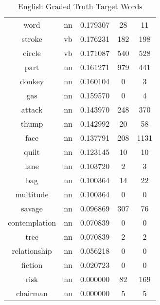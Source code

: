 \begin{table}
\begin{tabular}{ccccc}
word             & nn            & 0.179307           & 28                 & 11                  \\
stroke           & vb            & 0.176231           & 182                & 198                 \\
circle           & vb            & 0.171087           & 540                & 528                 \\
part             & nn            & 0.161271           & 979                & 441                 \\
donkey           & nn            & 0.160104           & 0                  & 3                   \\
gas              & nn            & 0.159570           & 0                  & 4                   \\
attack           & nn            & 0.143970           & 248                & 370                 \\
thump            & nn            & 0.142992           & 20                 & 58                  \\
face             & nn            & 0.137791           & 208                & 1131                \\
quilt            & nn            & 0.123145           & 10                 & 10                  \\
lane             & nn            & 0.103720           & 2                  & 3                   \\
bag              & nn            & 0.100364           & 14                 & 22                  \\
multitude        & nn            & 0.100364           & 0                  & 0                   \\
savage           & nn            & 0.096869           & 307                & 76                  \\
contemplation    & nn            & 0.070839           & 0                  & 0                   \\
tree             & nn            & 0.070839           & 2                  & 2                   \\
relationship     & nn            & 0.056218           & 0                  & 0                   \\
fiction          & nn            & 0.020723           & 0                  & 0                   \\
risk             & nn            & 0.000000           & 82                 & 169                 \\
chairman         & nn            & 0.000000           & 5                  & 5                   \\
\bottomrule
\end{tabular}
\caption{English Graded Truth Target Words}
\label{tab:eng-truthtargets}
\end{table}


